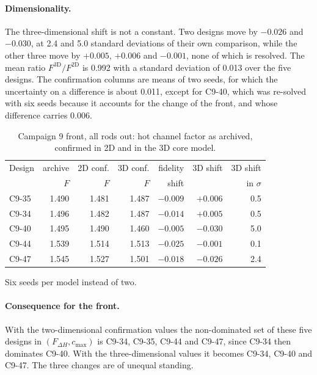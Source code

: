 \paragraph{Dimensionality.}
The three-dimensional shift is not a constant. Two designs move by
$-0.026$ and $-0.030$, at 2.4 and 5.0 standard deviations of their own
comparison, while the other three move by $+0.005$, $+0.006$ and
$-0.001$, none of which is resolved. The mean ratio
$F^\mathrm{3D}/F^\mathrm{2D}$ is 0.992 with a standard deviation of
0.013 over the five designs. The confirmation columns are means of two
seeds, for which the uncertainty on a difference is about 0.011, except
for C9-40, which was re-solved with six seeds because it accounts for
the change of the front, and whose difference carries 0.006.

\begin{table}[htbp]
  \centering
  \begin{threeparttable}
  \caption{Campaign 9 front, all rods out: hot channel factor as archived, confirmed in 2D and in the 3D core model.}
  \label{tab:c9-peaking}
  \small
  \begin{tabular}{@{}lrrrrrr@{}}
    \toprule
    Design & archive & 2D conf. & 3D conf. & fidelity & 3D shift &
    3D shift \\
     & $F$ & $F$ & $F$ & shift & & in $\sigma$ \\
    \midrule
    C9-35 & 1.490 & 1.481 & 1.487 & $-0.009$ & $+0.006$ & 0.5 \\
    C9-34 & 1.496 & 1.482 & 1.487 & $-0.014$ & $+0.005$ & 0.5 \\
    C9-40\tnote{a} & 1.495 & 1.490 & 1.460 & $-0.005$ & $-0.030$ & 5.0 \\
    C9-44 & 1.539 & 1.514 & 1.513 & $-0.025$ & $-0.001$ & 0.1 \\
    C9-47 & 1.545 & 1.527 & 1.501 & $-0.018$ & $-0.026$ & 2.4 \\
    \bottomrule
  \end{tabular}
  \begin{tablenotes}[flushleft]\footnotesize
    \item[a] Six seeds per model instead of two.
  \end{tablenotes}
  \end{threeparttable}
\end{table}

\paragraph{Consequence for the front.}
With the two-dimensional confirmation values the non-dominated set of these
five designs in $(F_{\Delta H}, c_\mathrm{max})$ is C9-34, C9-35, C9-44 and
C9-47, since C9-34 then dominates C9-40. With the three-dimensional values
it becomes C9-34, C9-40 and C9-47. The three changes are of unequal
standing.

